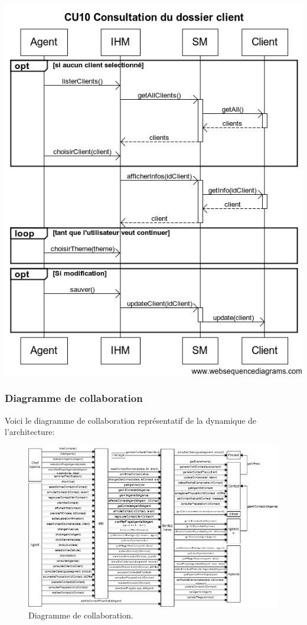\begin {center}
\includegraphics[width=\textwidth]{../../webSequenceDiagrameSources/cu10.png}
\end {center}

\subsubsection{Diagramme de collaboration}

Voici le diagramme de collaboration représentatif de la dynamique de
l'architecture:

\begin{figure}[H]
\centering
\includegraphics[angle=90]{diagramme-collaboration.png}
\caption*{Diagramme de collaboration.}
\end{figure}

